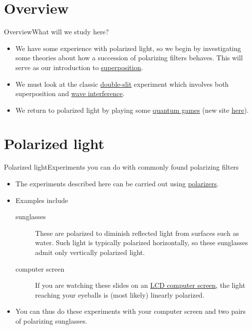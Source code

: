 
\section{Overview}
\begin{frame}{Overview}{What will we study here?}
\begin{itemize}
    \item We have some experience with polarized light, so we begin by investigating some theories about how a succession of polarizing filters behaves.  This will serve as our introduction to \href{https://en.wikipedia.org/wiki/Quantum_superposition}{superposition}.
    \item We must look at the classic \href{https://en.wikipedia.org/wiki/Double-slit_experiment}{double-slit} experiment which involves both superposition and \href{https://en.wikipedia.org/wiki/Wave_interference}{wave interference}.
    \item We return to polarized light by playing some \href{http://play.quantumgame.io/}{quantum games} (new site \href{https://lab.quantumflytrap.com/lab}{here}).
\end{itemize}
    
\end{frame}
\section{Polarized light}

\begin{frame}{Polarized light}{Experiments you can do with commonly found polarizing filters}
\begin{itemize}
    \item The experiments described here can be carried out using \href{https://en.wikipedia.org/wiki/Polarizer}{polarizers}.
    \item Examples include
    \begin{description}
        \item[sunglasses] These are polarized to diminish reflected light from surfaces such as water.  Such light is typically polarized horizontally, so these sunglasses admit only vertically polarized light.
        \item[computer screen]  If you are watching these slides on an \href{https://en.wikipedia.org/wiki/Liquid-crystal_display}{LCD computer screen}, the light reaching your eyeballs is (most likely) linearly polarized.
    \end{description}
    \item You can thus do these experiments with your computer screen and two pairs of polarizing sunglasses.
    
\end{itemize}
\end{frame}

